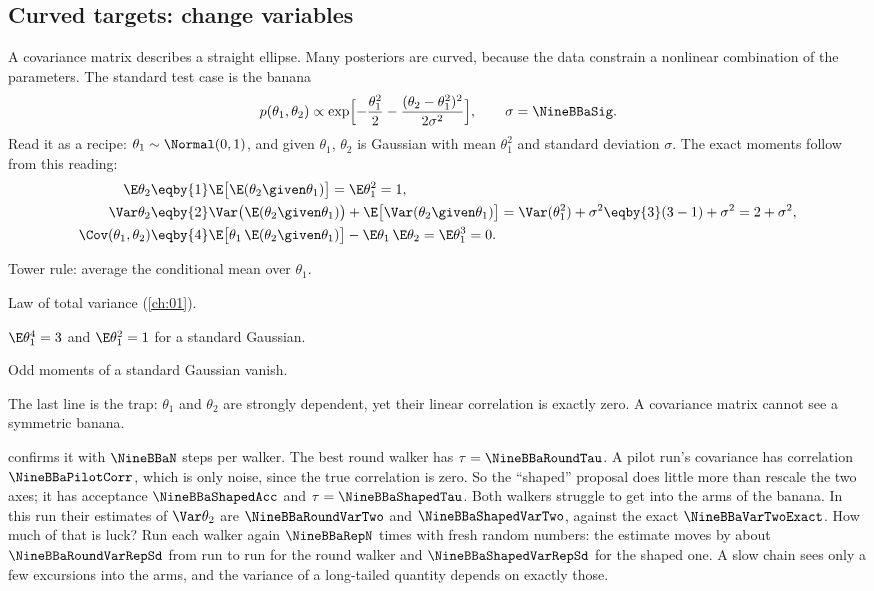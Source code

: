 \subsection{Curved targets: change variables}
\label{9b:sec:banana}

A covariance matrix describes a straight ellipse. Many posteriors are curved, because the data
constrain a nonlinear combination of the parameters. The standard test case is the banana
\begin{equation}
  p(\theta_1,\theta_2)\propto\exp\Bigl[-\frac{\theta_1^2}{2}
    -\frac{(\theta_2-\theta_1^2)^2}{2\sigma^2}\Bigr],\qquad\sigma=\NineBBaSig .
  \label{9b:eq:banana}
\end{equation}
Read it as a recipe: $\theta_1\sim\Normal(0,1)$, and given $\theta_1$, $\theta_2$ is Gaussian with
mean $\theta_1^2$ and standard deviation $\sigma$. The exact moments follow from this reading:
\begin{align*}
  \E\theta_2
  &\eqby{1}\E\bigl[\E(\theta_2\given\theta_1)\bigr]=\E\theta_1^2=1,
  \\
  \Var\theta_2
  &\eqby{2}\Var\bigl(\E(\theta_2\given\theta_1)\bigr)+\E\bigl[\Var(\theta_2\given\theta_1)\bigr]
   =\Var(\theta_1^2)+\sigma^2
   \eqby{3}(3-1)+\sigma^2=2+\sigma^2,
  \\
  \Cov(\theta_1,\theta_2)
  &\eqby{4}\E\bigl[\theta_1\,\E(\theta_2\given\theta_1)\bigr]-\E\theta_1\,\E\theta_2
   =\E\theta_1^3=0 .
\end{align*}
\begin{explain}
  \item Tower rule: average the conditional mean over $\theta_1$.
  \item Law of total variance (\cref{ch:01}).
  \item $\E\theta_1^4=3$ and $\E\theta_1^2=1$ for a standard Gaussian.
  \item Odd moments of a standard Gaussian vanish.
\end{explain}
The last line is the trap: $\theta_1$ and $\theta_2$ are strongly dependent, yet their linear
correlation is exactly zero. A covariance matrix cannot see a symmetric banana.

 confirms it with $\NineBBaN$ steps per walker. The best round walker has
$\tau=\NineBBaRoundTau$. A pilot run's covariance has correlation $\NineBBaPilotCorr$, which is
only noise, since the true correlation is zero. So the ``shaped'' proposal does little more than
rescale the two axes; it has acceptance
$\NineBBaShapedAcc$ and $\tau=\NineBBaShapedTau$. Both walkers struggle to get into the arms of
the banana. In this run their estimates of $\Var\theta_2$ are $\NineBBaRoundVarTwo$ and
$\NineBBaShapedVarTwo$, against the exact $\NineBBaVarTwoExact$. How much of that is luck? Run
each walker again $\NineBBaRepN$ times with fresh random numbers: the estimate moves by about
$\NineBBaRoundVarRepSd$ from run to run for the round walker and $\NineBBaShapedVarRepSd$ for the
shaped one. A slow chain sees only a few excursions into the arms, and the variance of a
long-tailed quantity depends on exactly those.

